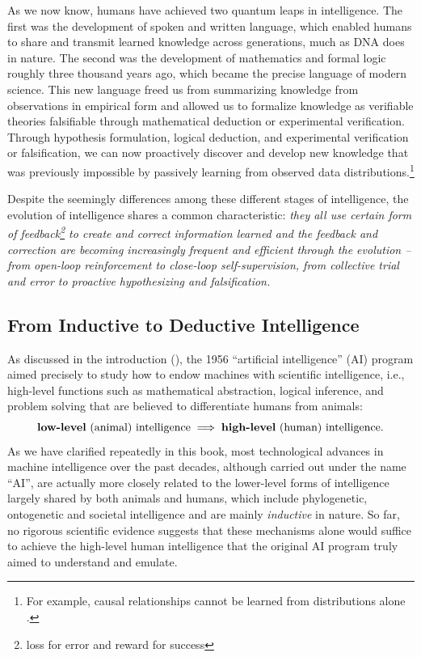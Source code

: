 \documentclass[../../book-main.tex]{subfiles}
\begin{document}
As we now know, humans have achieved two quantum leaps in intelligence. The first was the development of spoken and written language, which enabled humans to share and transmit learned knowledge across generations, much as DNA does in nature. The second was the development of mathematics and formal logic roughly three thousand years ago, which became the precise language of modern science. This new language freed us from summarizing knowledge from observations in empirical form and allowed us to formalize knowledge as verifiable theories falsifiable through mathematical deduction or experimental verification. Through hypothesis formulation, logical deduction, and experimental verification or falsification, we can now proactively discover and develop new knowledge that was previously impossible by passively learning from observed data distributions.\footnote{For example, causal relationships cannot be learned from distributions alone \cite{Pearl-2009}.}

Despite the seemingly differences among these different stages of intelligence, the evolution of intelligence shares a common characteristic: {\em they all use certain form of feedback\footnote{loss for error and reward for success} to create and correct information learned and the feedback and correction are becoming increasingly frequent and efficient through the evolution -- from open-loop reinforcement to close-loop self-supervision, from collective trial and error to proactive hypothesizing and falsification.}

\subsection{From Inductive to Deductive Intelligence}
As discussed in the introduction (), the 1956 ``artificial intelligence'' (AI) program aimed precisely to study how to endow machines with scientific intelligence, i.e., high-level functions such as mathematical abstraction, logical inference, and problem solving that are believed to differentiate humans from animals:
\begin{equation*}
   \text{\textbf{low-level} (animal) intelligence} \; \Longrightarrow \; 
   \text{\textbf{high-level} (human) intelligence.}
\end{equation*}
As we have clarified repeatedly in this book, most technological advances in machine intelligence over the past decades, although carried out under the name ``AI'', are actually more closely related to the lower-level forms of  intelligence largely shared by both animals and humans, which include phylogenetic, ontogenetic and societal intelligence and are mainly {\em inductive} in nature. So far, no rigorous scientific evidence suggests that these mechanisms alone would suffice to achieve the high-level human intelligence that the original AI program truly aimed to understand and emulate.
\end{document}
